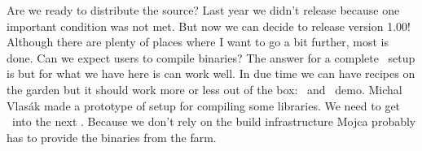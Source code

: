 \stoptitle

\starttitle[title=Compiling]

\startitemize
    \startitem
        Are we ready to distribute the source? Last year we didn't release
        because one important condition was not met. But now we can decide to
        release version 1.00!
    \stopitem
    \startitem
        Although there are plenty of places where I want to go a bit further,
        most is done.
    \stopitem
    \startitem
        Can we expect users to compile binaries? The answer for a complete
        \TEXLIVE\ setup is  but for what we have here is can work
        well.
    \stopitem
    \startitem
        In due time we can have recipes on the garden but it should work more
        or less out of the box: \LINUX\ and \MSWINDOWS\ demo.
    \stopitem
    \startitem
        Michal Vlasák made a prototype of setup for compiling some libraries.
    \stopitem
    \startitem
        We need to get \LMTX\ into the next \TEXLIVE. Because we don't rely on
        the build infrastructure Mojca probably has to provide the binaries from
        the farm.
    \stopitem
\stopitemize

\stoptitle

\stoptext
